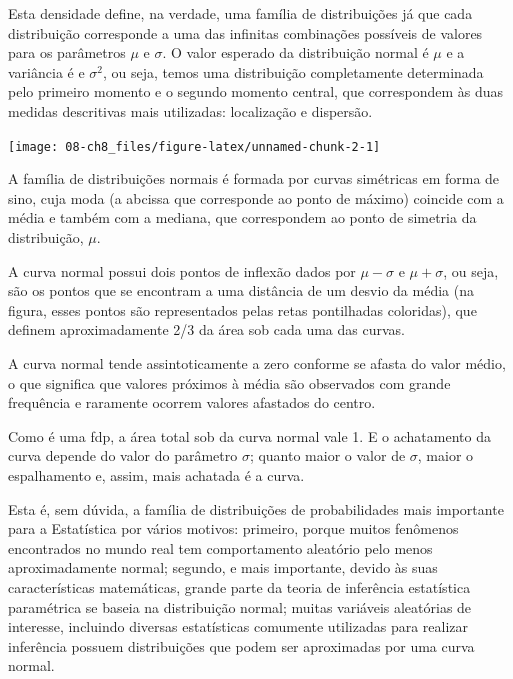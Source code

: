 \documentclass[
]{book}
\theoremstyle{definition}
\theoremstyle{definition}
\theoremstyle{definition}
\theoremstyle{remark}
\begin{document}
Esta densidade define, na verdade, uma família de distribuições já que cada distribuição corresponde a uma das infinitas combinações possíveis de valores para os parâmetros \(\mu\) e \(\sigma\). O valor esperado da distribuição normal é \(\mu\) e a variância é e \(\sigma^2\), ou seja, temos uma distribuição completamente determinada pelo primeiro momento e o segundo momento central, que correspondem às duas medidas descritivas mais utilizadas: localização e dispersão.

\begin{center}\texttt{[image: 08-ch8\_files/figure-latex/unnamed-chunk-2-1]} \end{center}

A família de distribuições normais é formada por curvas simétricas em forma de sino, cuja moda (a abcissa que corresponde ao ponto de máximo) coincide com a média e também com a mediana, que correspondem ao ponto de simetria da distribuição, \(\mu\).

A curva normal possui dois pontos de inflexão dados por \(\mu - \sigma\) e \(\mu + \sigma\), ou seja, são os pontos que se encontram a uma distância de um desvio da média (na figura, esses pontos são representados pelas retas pontilhadas coloridas), que definem aproximadamente 2/3 da área sob cada uma das curvas.

A curva normal tende assintoticamente a zero conforme se afasta do valor médio, o que significa que valores próximos à média são observados com grande frequência e raramente ocorrem valores afastados do centro.

Como é uma fdp, a área total sob da curva normal vale 1. E o achatamento da curva depende do valor do parâmetro \(\sigma\); quanto maior o valor de \(\sigma\), maior o espalhamento e, assim, mais achatada é a curva.

Esta é, sem dúvida, a família de distribuições de probabilidades mais importante para a Estatística por vários motivos: primeiro, porque muitos fenômenos encontrados no mundo real tem comportamento aleatório pelo menos aproximadamente normal; segundo, e mais importante, devido às suas características matemáticas, grande parte da teoria de inferência estatística paramétrica se baseia na distribuição normal; muitas variáveis aleatórias de interesse, incluindo diversas estatísticas comumente utilizadas para realizar inferência possuem distribuições que podem ser aproximadas por uma curva normal.
\end{document}
